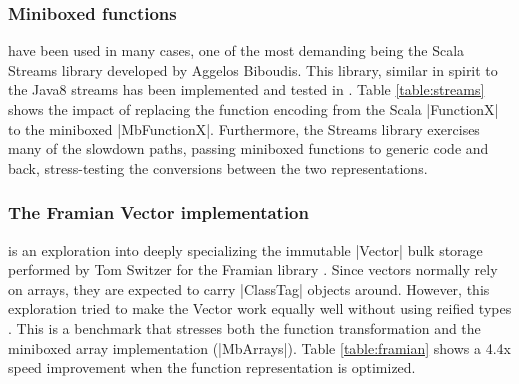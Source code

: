 \subsubsection{Miniboxed functions} have been used in many cases, one of the most demanding being the Scala Streams library developed by Aggelos Biboudis. This library, similar in spirit to the Java8 streams has been implemented and tested in \cite{biboudis_clash_2014}. Table \ref{table:streams} shows the impact of replacing the function encoding from the Scala |FunctionX| to the miniboxed |MbFunctionX|. Furthermore, the Streams library exercises many of the slowdown paths, passing miniboxed functions to generic code and back, stress-testing the conversions between the two representations.

\subsubsection{The Framian Vector implementation} is an exploration into deeply specializing the immutable |Vector| bulk storage performed by Tom Switzer for the Framian library \cite{framian}. Since vectors normally rely on arrays, they are expected to carry |ClassTag| objects around. However, this exploration tried to make the Vector work equally well without using reified types \cite{tixxit-respecialization15,tixxit-respecialization6}. This is a benchmark that stresses both the function transformation and the miniboxed array implementation (|MbArrays|). Table \ref{table:framian} shows a 4.4x speed improvement when the function representation is optimized.
